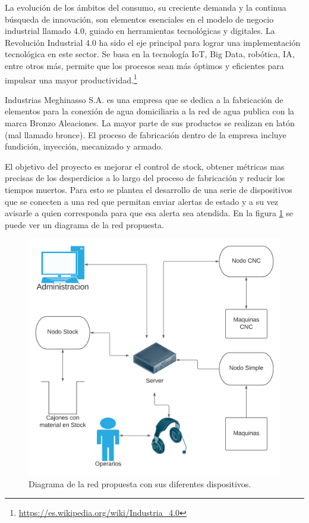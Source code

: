 \documentclass[11pt]{charter}
\begin{document}
La evolución de los ámbitos del consumo, su creciente demanda y la continua búsqueda de innovación, son elementos esenciales en el modelo de negocio industrial llamado 4.0, guiado en herramientas tecnológicas y digitales. La Revolución Industrial 4.0 ha sido el eje principal para lograr una implementación tecnológica en este sector. Se basa en la tecnología IoT, Big Data, robótica, IA, entre otros más, permite que los procesos sean más óptimos y eficientes para impulsar una mayor productividad.\footnote{\url{https://es.wikipedia.org/wiki/Industria_4.0}}

Industrias Meghinasso S.A. es una empresa que se dedica a la fabricación de elementos para la conexión de agua domiciliaria a la red de agua publica con la marca Bronzo Aleaciones. La mayor parte de sus productos se realizan en latón (mal llamado bronce). El proceso de fabricación dentro de la empresa incluye fundición, inyección, mecanizado y armado. 

El objetivo del proyecto es mejorar el control de stock, obtener métricas mas precisas de los desperdicios a lo largo del proceso de fabricación y reducir los tiempos muertos. Para esto se plantea el desarrollo de una serie de dispositivos que se conecten a una red que permitan enviar alertas de estado y a su vez avisarle a quien corresponda para que esa alerta sea atendida. En la figura \ref{fig:DiagramaRed} se puede ver un diagrama de la red propuesta. 

\begin{figure}[H]
    \centering
    \includegraphics[scale=0.5]{Figuras/diagBloquesRed.png}
    \caption{Diagrama de la red propuesta con sus diferentes dispositivos.}
    \label{fig:DiagramaRed}
\end{figure}
\end{document}
